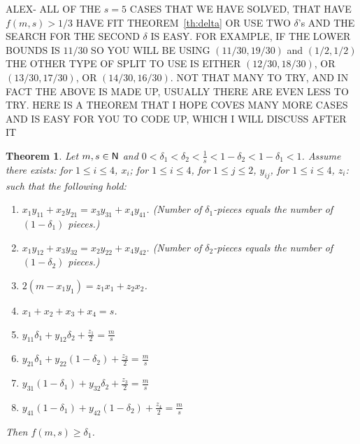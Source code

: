 \documentclass[12pt]{article}
\newcommand{\nat}{{\sf N}}
\newtheorem{theoremfoo}{Theorem}[section] %
\newenvironment{theorem}{\pagebreak[1]\begin{theoremfoo}}{\end{theoremfoo}}
\begin{document}
ALEX- ALL OF THE $s=5$ CASES THAT WE HAVE SOLVED, THAT HAVE $f(m,s)>1/3$
HAVE FIT THEOREM~\ref{th:delta} OR USE
TWO $\delta$'s AND THE SEARCH FOR THE SECOND $\delta$ IS EASY. FOR EXAMPLE, IF THE
LOWER BOUNDS IS $11/30$ SO YOU WILL BE USING $(11/30,19/30)$ and $(1/2,1/2)$ THE OTHER
TYPE OF SPLIT TO USE IS EITHER 
$(12/30,18/30)$,
OR
$(13/30,17/30)$,
OR
$(14/30,16/30)$.
NOT THAT MANY TO TRY, AND IN FACT THE ABOVE IS MADE UP, USUALLY THERE ARE EVEN LESS TO TRY.
HERE IS A THEOREM THAT I HOPE COVES MANY MORE CASES AND IS EASY FOR YOU TO CODE UP, WHICH I 
WILL DISCUSS AFTER IT

\begin{theorem}\label{th:delta2}
Let $m,s\in\nat$ and 
$0< \delta_1 < \delta_2 < \frac{1}{s} < 1-\delta_2 < 1-\delta_1 < 1$.
Assume there exists:
for $1\le i\le 4$, $x_i$;
for $1\le i \le 4$, for $1\le j\le 2$, $y_{ij}$,
for $1\le i\le 4$, $z_i$:
such that the following hold:
\begin{enumerate}
\item
$x_1y_{11}+x_2y_{21}=x_3y_{31}+x_4y_{41}$. (Number of $\delta_1$-pieces equals the number of $(1-\delta_1)$ pieces.)
\item
$x_1y_{12}+x_3y_{32}=x_2y_{22}+x_4y_{42}$. (Number of $\delta_2$-pieces equals the number of $(1-\delta_2)$ pieces.)
\item
$2(m-x_1y_1)=z_1x_1+z_2x_2$.
\item
$x_1+x_2+x_3+x_4=s$.
\item
$y_{11}\delta_1+y_{12}\delta_2+\frac{z_1}{2}=\frac{m}{s}$
\item
$y_{21}\delta_1+y_{22}(1-\delta_2)+\frac{z_2}{2}=\frac{m}{s}$
\item
$y_{31}(1-\delta_1)+y_{32}\delta_2+\frac{z_3}{2}=\frac{m}{s}$
\item
$y_{41}(1-\delta_1)+y_{42}(1-\delta_2)+\frac{z_4}{2}=\frac{m}{s}$
\end{enumerate}

Then $f(m,s) \ge \delta_1$.
\end{theorem}
\end{document}
